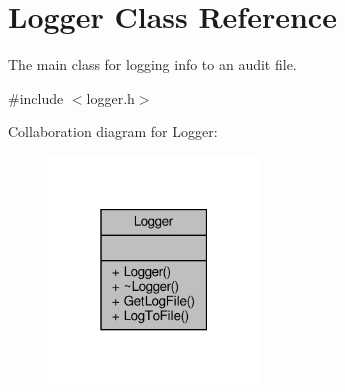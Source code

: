 \hypertarget{classLogger}{}\section{Logger Class Reference}
\label{classLogger}


The main class for logging info to an audit file.  




{\ttfamily \#include $<$logger.\+h$>$}



Collaboration diagram for Logger\+:
\nopagebreak
\begin{figure}[H]
\begin{center}
\leavevmode
\includegraphics[width=159pt]{classLogger__coll__graph}
\end{center}
\end{figure}
